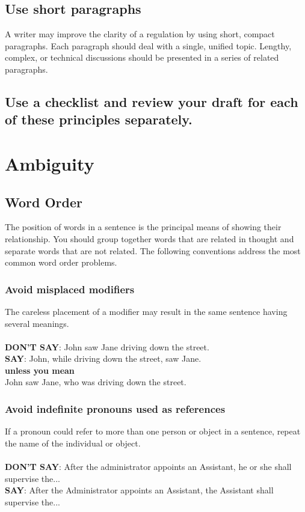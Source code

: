\documentclass[12pt, letterpaper]{report}
\begin{document}
\begin{linenumbers}
 \section{Use short paragraphs}
  A writer may improve the clarity of a regulation by using short, compact paragraphs. Each paragraph should deal with a single, unified topic. Lengthy, complex, or technical discussions should be presented in a series of related paragraphs.
\section{Use a checklist and review your draft for each of these principles separately. }
    \chapter{Ambiguity}
	    \section{Word Order}
	        The position of words in a sentence is the principal means of showing their relationship. You should group together words that are related in thought and separate words that are not related. The following conventions address the most common word order problems.
            \subsection{Avoid misplaced modifiers}
                The careless placement of a modifier may result in the same sentence having several meanings.\\\\
                \textbf{DON'T SAY}: John saw Jane driving down the street.\\
                \textbf{SAY}: John, while driving down the street, saw Jane.\\
                \textbf{unless you mean}\\
                John saw Jane, who was driving down the street.
            \subsection{Avoid indefinite pronouns used as references} 
                If a pronoun could refer to more than one person or object in a sentence, repeat the name of the individual or object.\\\\
                \textbf{DON'T SAY}: After the administrator appoints an Assistant, he or she shall supervise the...\\
                \textbf{SAY}: After the Administrator appoints an Assistant, the Assistant shall supervise the...

\end{linenumbers}
\end{document}
